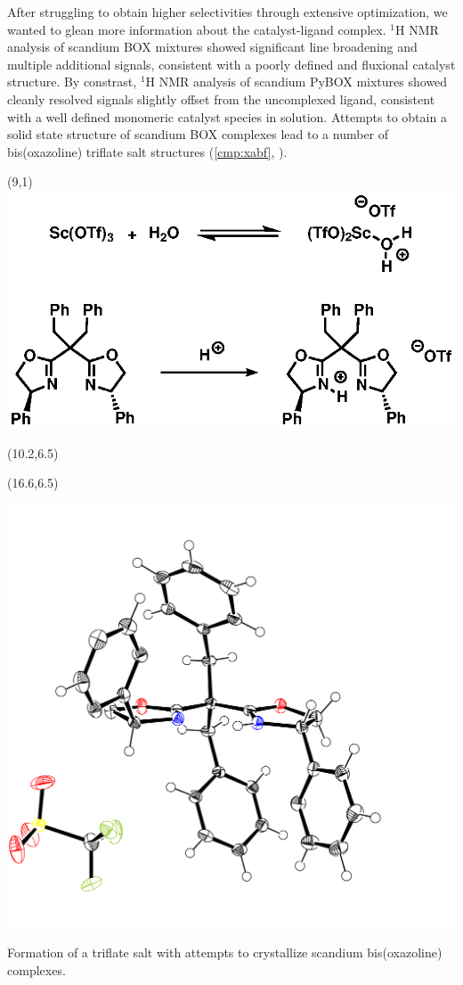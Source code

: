 After struggling to obtain higher selectivities through extensive optimization, we wanted to
glean more information about the catalyst-ligand complex. $^1$H NMR analysis of scandium BOX
mixtures showed significant line broadening and multiple additional signals, consistent with a
poorly defined and fluxional catalyst structure. By constrast, $^1$H NMR analysis of scandium PyBOX
mixtures showed cleanly resolved signals slightly offset from the uncomplexed ligand, consistent with a well
defined monomeric catalyst species in solution. Attempts to obtain a solid state structure of
scandium BOX complexes lead to a number of bis(oxazoline) triflate salt structures
(\ce{->}\ref{cmp:xabf}, ). 
 \begin{Scheme}[h]
  \begin{textblock}{1}(9,1) \includegraphics[scale=0.8]{chp_asymmetric/images/triflatesaltformation}
  \end{textblock}
   \begin{textblock}{1}(10.2,6.5)  \end{textblock}
   \begin{textblock}{1}(16.6,6.5)  \end{textblock}
  \includegraphics[scale=0.35]{chp_asymmetric/images/xray/xabf_nolabels}
  \caption{Formation of a triflate salt with attempts to crystallize scandium bis(oxazoline) complexes.}
  \label{sch:boxtriflatesalt}
\end{Scheme}
